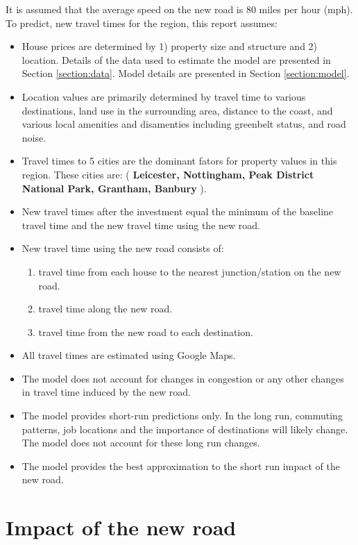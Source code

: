 \documentclass{article}\usepackage[]{graphicx}\usepackage[]{color}
\begin{document}
It is assumed that the average speed on the new road is 80 miles per hour (mph).
To predict, new travel times for the region, this report assumes:
\begin{itemize}
\item House prices are determined by 1) property size and structure and 2) location. Details of the data used to estimate the model are presented in Section \ref{section:data}. Model details are presented in Section \ref{section:model}.
\item Location values are primarily determined by travel time to various destinations, land use in the surrounding area, distance to the coast, and various local amenities and disamenties including greenbelt status, and road noise.  
\item Travel times to 5 cities are the dominant fators for property values in this region. These cities are: (\textbf{ Leicester, Nottingham, Peak District National Park, Grantham, Banbury} ).
\item New travel times after the investment equal the minimum of the baseline travel time and the new travel time using the new road. 
\item New travel time using the new road consists of:
\begin{enumerate}
\item travel time from each house to the nearest junction/station on the new road.
\item travel time along the new road.
\item travel time from the new road to each destination.
\end{enumerate}
\item All travel times are estimated using Google Maps.
\item The model does not account for changes in congestion or any other changes in travel time induced by the new road.
\item The model provides short-run predictions only. In the long run, commuting patterns, job locations and the importance of destinations will likely change. The model does not account for these long run changes.
\item The model provides the best approximation to the short run impact of the new road.
\end{itemize}

\section{Impact of the new road}
\end{document}
